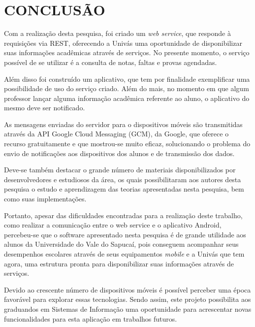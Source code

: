 
\chapter{CONCLUSÃO} 

	\par Com a realização desta pesquisa, foi criado um \textit{web service}, que
responde à requisições via REST, oferecendo a Univás uma oportunidade de
disponibilizar suas informações acadêmicas através de serviços. No presente
momento, o serviço possível de se utilizar é a consulta de notas, faltas e provas
agendadas.

	\par Além disso foi construído um aplicativo, que tem por finalidade
exemplificar uma possibilidade de uso do serviço criado. Além do mais, no
momento em que algum professor lançar alguma informação acadêmica referente ao
aluno, o aplicativo do mesmo deve ser notificado.

	\par As mensagens enviadas do servidor para o dispositivos móveis são
transmitidas através da API Google Cloud Messaging (GCM), da Google, que
oferece o recurso gratuitamente e que mostrou-se muito eficaz, solucionando o
problema do envio de notificações aos dispositivos dos alunos  e de transmissão
dos dados.

	\par Deve-se também destacar o grande número de materiais disponibilizados por
desenvolvedores e estudiosos da área, os quais possibilitaram aos autores desta
pesquisa o estudo e aprendizagem das teorias apresentadas nesta pesquisa, bem
como suas implementações.

	\par Portanto, apesar das dificuldades encontradas para a realização deste
trabalho, como realizar a comunicação entre o web service e o aplicativo
Android, percebeu-se que o software apresentado nesta pesquisa é de grande
utilidade aos alunos da Universidade do Vale do Sapucaí, pois conseguem
acompanhar seus desempenhos escolares através de seus equipamentos
\textit{mobile} e a Univás que tem agora, uma estrutura pronta para
disponibilizar suas informações através de serviços.

	\par Devido ao crescente número de dispositivos móveis é possível perceber uma
época favorável para explorar essas tecnologias. Sendo assim, este projeto
possibilita aos graduandos em Sistemas de Informação uma oportunidade para
acrescentar novas funcionalidades para esta aplicação em trabalhos futuros.

